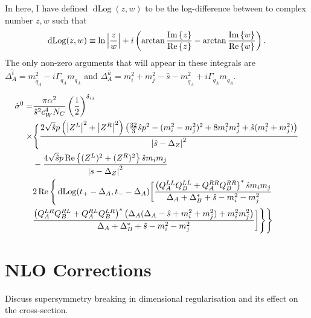 \documentclass[../main.tex]{subfiles}
\begin{document}
In here, I have defined \(\operatorname{dLog}(z, w)\) to be the log-difference between to complex number \(z, w\) such that
\begin{equation}
	\operatorname{dLog}(z, w) \equiv \ln\left|\frac{z}{w}\right| + i\left(\arctan\frac{\operatorname{Im}\left\{z\right\}}{\operatorname{Re}\left\{z\right\}} - \arctan\frac{\operatorname{Im}\left\{w\right\}}{\operatorname{Re}\left\{w\right\}}\right).
\end{equation}
The only non-zero arguments that will appear in these integrals are \(\Delta^{\hat{t}}_A = m_{\tilde{q}_A}^2 - i\Gamma_{\tilde{q}_A} m_{\tilde{q}_A}\) and \(\Delta^{\hat{u}}_A = m_i^2 + m_j^2 - \hat{s} - m_{\tilde{q}_A}^2 + i\Gamma_{\tilde{q}_A} m_{\tilde{q}_A}\).

\begin{temporary}
	\begin{align}
		\hat{\sigma}^0 = & \frac{\pi \alpha^2}{\hat{s}^2 c_W^4 N_C} \left(\frac{1}{2}\right)^{\delta_{ij}}                                                                                                                                   \\
		\times           & \Bigg\{ \frac{2\sqrt{\hat{s}}p\left(\left|Z^L\right|^2 + \left|Z^R\right|^2\right) \left(\frac{32}{3}\hat{s} p^2 - (m_i^2-m_j^2)^2 + 8m_i^2 m_j^2 + \hat{s}(m_i^2+m_j^2)\right)}{\left|\hat{s}-\Delta_Z\right|^2}                         \\
		                 & - \frac{4\sqrt{\hat{s}}p\operatorname{Re}\left\{(Z^L)^2 + (Z^R)^2\right\} \hat{s} m_i m_j}{\left|s-\Delta_Z\right|^2}                                                                                                                            \\
		                 & 2\operatorname{Re}\Bigg\{ \operatorname{dLog}(t_+ - \Delta_A, t_- - \Delta_A) \bigg[ \frac{\left(Q_A^{LL}Q_B^{LL}+Q_A^{RR}Q_B^{RR}\right)^\ast \hat{s}m_im_j}{\Delta_A + \Delta_B^\ast + \hat{s} - m_i^2 - m_j^2} \\
		                 & \frac{\left(Q_A^{LR}Q_B^{RL}+Q_A^{RL}Q_B^{LR}\right)^\ast \left(\Delta_A(\Delta_A-\hat{s}+m_i^2+m_j^2) + m_i^2 m_j^2\right)}{\Delta_A + \Delta_B^\ast + \hat{s} - m_i^2 - m_j^2} \bigg] \Bigg\}
		\Bigg\}
	\end{align}
\end{temporary}

\section{NLO Corrections}
\begin{TODO}
	\item Discuss supersymmetry breaking in dimensional regularisation and its effect on
	the cross-section.
\end{TODO}
\end{document}
